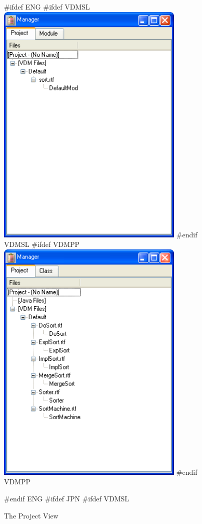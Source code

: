 \documentclass[\pformat,12pt]{article}
\begin{document}
\begin{figure}[tbh]
\begin{center}
\mbox{}
#ifdef ENG
#ifdef VDMSL
\includegraphics[width=9cm]{projectView-slENG.png}
#endif VDMSL
#ifdef VDMPP
\includegraphics[width=9cm]{projectView-ppENG.png}
#endif VDMPP
\caption{The Project View}
#endif ENG
#ifdef JPN
#ifdef VDMSL

\end{center}
\end{figure}
\end{document}
